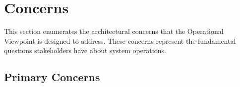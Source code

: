 \documentclass[11pt,letterpaper]{article}
\begin{document}
\section{Concerns}

This section enumerates the architectural concerns that the Operational Viewpoint is designed to address. These concerns represent the fundamental questions stakeholders have about system operations.

\subsection{Primary Concerns}
\end{document}
